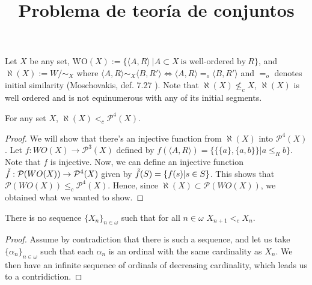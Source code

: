 \documentclass{article}
\title{Problema de teoría de conjuntos}
\begin{document}
	

\begin{definition}\label{aleph}
    Let $X$ be any set, $\text{WO}(X):=\{\langle A,R\rangle\ |A\subset X \ \text{is well-ordered by}\ R\}$, 
    and $\aleph(X):= W/{\sim_X}$ 
    where $\langle A,R\rangle \sim_X \langle B, R'\rangle \Longleftrightarrow \langle A, R\rangle =_o \langle B, R'\rangle$ and $=_o$ denotes initial similarity (Moschovakis, def. 7.27 \cite{Moscho}).
    Note that $\aleph(X)\nleq_c X$, $\aleph(X)$ is well ordered and is not equinumerous with any of its initial segments.
\end{definition}


\begin{theorem}
	For any set $X$, $\aleph(X)<_c \mathcal{P}^4(X)$.
\end{theorem}

\begin{proof}
We will show that there's an injective function from $\aleph(X)$ into $\mathcal{P}^4(X)$. Let $f:WO(X)\rightarrow \mathcal{P}^3(X)$ defined by $f(\langle A,R\rangle) = \{\{\{a\},\{a,b\}\}| a\leq_R b\}$. Note that $f$ is injective. Now, we can define an injective function $\Tilde{f}: \mathcal{P} (WO(X)) \rightarrow \mathcal{P}^4(X)$ given by $\Tilde{f}(S) = \{f(s) | s\in S\}$. This shows that $\mathcal{P} (WO(X)) \leq_c \mathcal{P}^4(X)$. Hence, since $\aleph (X) \subset \mathcal{P} (WO(X))$, we obtained what we wanted to show.
\end{proof}

\begin{theorem}[ZFC]
	There is no sequence $\{X_n\}_{n\in\omega}$ such that for all $n\in\omega$ $X_{n+1} <_c X_n$.
\end{theorem}
\begin{proof}
	Assume by contradiction that there is such a sequence, and let us take $\{\alpha_n\}_{n\in\omega}$ such that each $\alpha_n$ is an ordinal with the same cardinality as $X_n$. We then have an infinite sequence of ordinals of decreasing cardinality, which leads us to a contridiction.
\end{proof}
\end{document}
